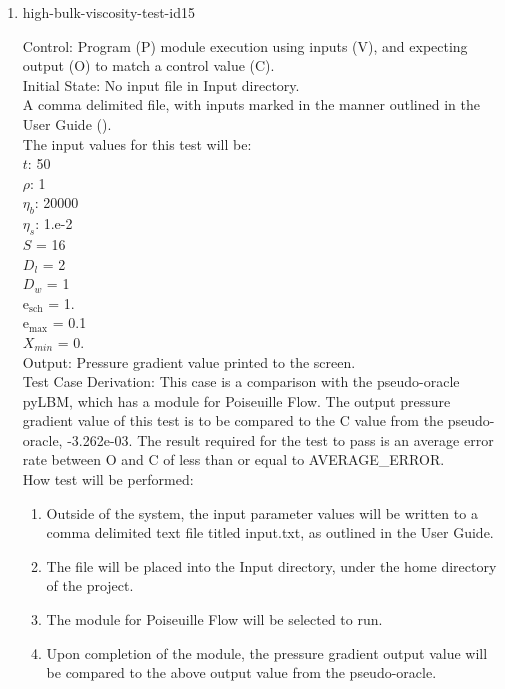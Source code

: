 \documentclass[12pt, titlepage]{article}
\begin{document}
\begin{enumerate}
\item{high-bulk-viscosity-test-id15\\}

Control: Program (P) module execution using inputs (V), and expecting output (O) to match a control value (C).\\
					
Initial State: No input file in Input directory.\\
					
A comma delimited file, with inputs marked in the manner outlined in the User Guide (\citet{LBM_UserGuide_PM}).\\The input values for this test will be:\\
$t$: 50\\
$\rho$: 1\\
$\eta_b$: 20000\\
$\eta_s$: 1.e-2\\
$S$ = 16\\
$D_{l}$ = 2\\
$D_{w}$ = 1\\
$\mathrm{e_{sch}}$ = 1.\\
$\mathrm{e_{max}}$ = 0.1\\
$X_{min}$ = 0.\\

					
Output: Pressure gradient value printed to the screen.  \\

Test Case Derivation: This case is a comparison with the pseudo-oracle pyLBM, which has a module for Poiseuille Flow. The output pressure gradient value of this test is to be compared to the C value from the pseudo-oracle, -3.262e-03. The result required for the test to pass is an average error rate between O and C of less than or equal to AVERAGE\_ERROR.\\

					
How test will be performed: 

\begin{enumerate}
\item Outside of the system, the input parameter values will be written to a comma delimited text file titled input.txt, as outlined in the User Guide.
\item The file will be placed into the Input directory, under the home directory of the project.
\item The module for Poiseuille Flow will be selected to run.
\item Upon completion of the module, the pressure gradient output value will be compared to the above output value from the pseudo-oracle.
\end{enumerate}	


\end{enumerate}
\end{document}
